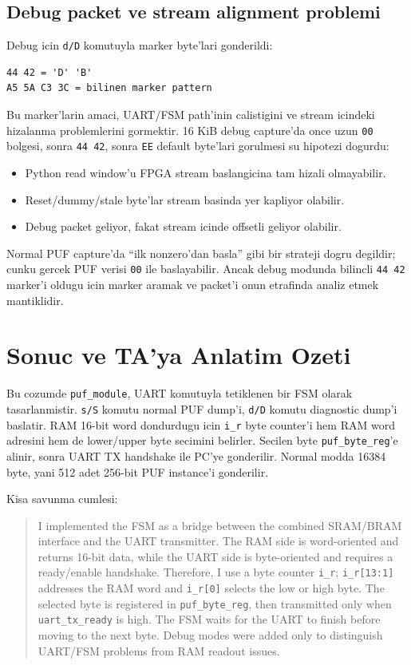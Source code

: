 \documentclass[11pt,a4paper]{article}
\begin{document}
\subsection{Debug packet ve stream alignment problemi}
Debug icin \texttt{d/D} komutuyla marker byte'lari gonderildi:
\begin{lstlisting}[style=bashstyle]
44 42 = 'D' 'B'
A5 5A C3 3C = bilinen marker pattern
\end{lstlisting}

Bu marker'larin amaci, UART/FSM path'inin calistigini ve stream icindeki hizalanma problemlerini gormektir. 16 KiB debug capture'da once uzun \texttt{00} bolgesi, sonra \texttt{44 42}, sonra \texttt{EE} default byte'lari gorulmesi su hipotezi dogurdu:

\begin{itemize}
  \item Python read window'u FPGA stream baslangicina tam hizali olmayabilir.
  \item Reset/dummy/stale byte'lar stream basinda yer kapliyor olabilir.
  \item Debug packet geliyor, fakat stream icinde offsetli geliyor olabilir.
\end{itemize}

Normal PUF capture'da ``ilk nonzero'dan basla'' gibi bir strateji dogru degildir; cunku gercek PUF verisi \texttt{00} ile baslayabilir. Ancak debug modunda bilincli \texttt{44 42} marker'i oldugu icin marker aramak ve packet'i onun etrafinda analiz etmek mantiklidir.

\section{Sonuc ve TA'ya Anlatim Ozeti}

Bu cozumde \texttt{puf\_module}, UART komutuyla tetiklenen bir FSM olarak tasarlanmistir. \texttt{s/S} komutu normal PUF dump'i, \texttt{d/D} komutu diagnostic dump'i baslatir. RAM 16-bit word dondurdugu icin \texttt{i\_r} byte counter'i hem RAM word adresini hem de lower/upper byte secimini belirler. Secilen byte \texttt{puf\_byte\_reg}'e alinir, sonra UART TX handshake ile PC'ye gonderilir. Normal modda 16384 byte, yani 512 adet 256-bit PUF instance'i gonderilir.

Kisa savunma cumlesi:

\begin{quote}
I implemented the FSM as a bridge between the combined SRAM/BRAM interface and the UART transmitter. The RAM side is word-oriented and returns 16-bit data, while the UART side is byte-oriented and requires a ready/enable handshake. Therefore, I use a byte counter \texttt{i\_r}; \texttt{i\_r[13:1]} addresses the RAM word and \texttt{i\_r[0]} selects the low or high byte. The selected byte is registered in \texttt{puf\_byte\_reg}, then transmitted only when \texttt{uart\_tx\_ready} is high. The FSM waits for the UART to finish before moving to the next byte. Debug modes were added only to distinguish UART/FSM problems from RAM readout issues.
\end{quote}
\end{document}
